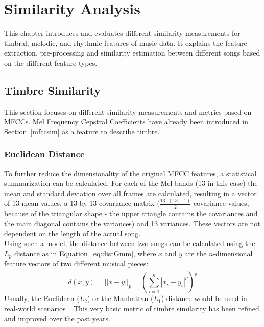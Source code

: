 
\chapter{Similarity Analysis}\label{simanal}


This chapter introduces and evaluates different similarity measurements for timbral, melodic, and rhythmic features of music data. It explains the feature extraction, pre-processing and similarity estimation between different songs based on the different feature types. 

\section{Timbre Similarity} \label{musly}

This section focuses on different similarity measurements and metrics based on MFCCs. Mel Frequency Cepstral Coefficients have already been introduced in Section~\ref{mfccsim} as a feature to describe timbre.\\

\subsection{Euclidean Distance}\label{mfcceuc}

To further reduce the dimensionality of the original MFCC features, a statistical summarization can be calculated. For each of the Mel-bands (13 in this case) the mean and standard deviation over all frames are calculated, resulting in a vector of 13 mean values, a 13 by 13 covariance matrix ($\frac{13\cdot(13-1)}{2}$ covariance values, because of the triangular shape - the upper triangle contains the covariances and the main diagonal contains the variances) and 13 variances. These vectors are not dependent on the length of the actual song.~\cite[pp. 51ff]{knees1}\\
Using such a model, the distance between two songs can be calculated using the $L_p$ distance as in Equation~\eqref{eq:distGmm}, where $x$ and $y$ are the $n$-dimensional feature vectors of two different musical pieces:
\begin{equation} \label{eq:distGmm}
d(x, y) = ||x - y||_p = \left(\sum_{i=1}^{n}{|x_i - y_i|^p}\right)^{\frac{1}{p}}
\end{equation}
Usually, the Euclidean ($L_2$) or the Manhattan ($L_1$) distance would be used in real-world scenarios~\cite[p. 58]{knees1}. This very basic metric of timbre similarity has been refined and improved over the past years.

